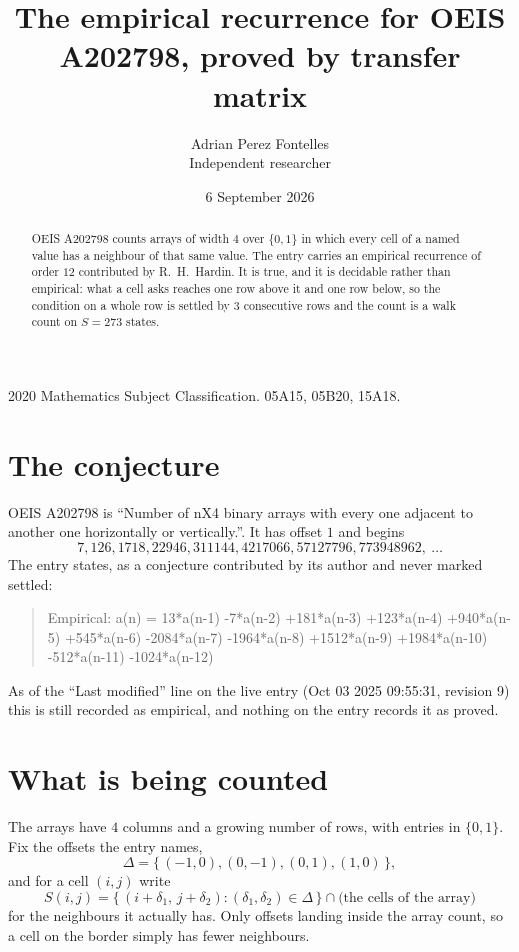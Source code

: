 \documentclass[11pt,a4paper]{article}
\title{The empirical recurrence for OEIS A202798, proved by transfer matrix}
\author{Adrian Perez Fontelles\\ \small Independent researcher}
\date{6 September 2026}
\theoremstyle{plain}
\theoremstyle{definition}
\begin{document}
\maketitle

\begin{abstract}
OEIS A202798 counts arrays of width $4$ over $\{0,1\}$ in which every cell of a named value has a neighbour of that same value. The entry carries an
empirical recurrence of order $12$ contributed by R.~H.~Hardin. It is true, and it is
decidable rather than empirical: what a cell asks reaches one row above it and one row below, so the
condition on a whole row is settled by $3$ consecutive rows and the count is a walk
count on $S=273$ states.
\end{abstract}

\noindent\small 2020 Mathematics Subject Classification. 05A15, 05B20, 15A18.\normalsize

\section{The conjecture}

OEIS A202798 is ``Number of nX4 binary arrays with every one adjacent to another one horizontally or vertically.''. It has offset $1$ and begins
\[
7, 126, 1718, 22946, 311144, 4217066, 57127796, 773948962,\ \dots
\]
The entry states, as a conjecture contributed by its author and never marked settled:
\begin{quote}
Empirical: a(n) = 13*a(n-1) -7*a(n-2) +181*a(n-3) +123*a(n-4) +940*a(n-5) +545*a(n-6) -2084*a(n-7) -1964*a(n-8) +1512*a(n-9) +1984*a(n-10) -512*a(n-11) -1024*a(n-12)
\end{quote}
As of the ``Last modified'' line on the live entry (Oct 03 2025 09:55:31, revision 9) this is still
recorded as empirical, and nothing on the entry records it as proved.

\section{What is being counted}

The arrays have $4$ columns and a growing number of rows, with entries in $\{0,1\}$. Fix the
offsets the entry names,
\[
\Delta=\{\,(-1,0), (0,-1), (0,1), (1,0)\,\},
\]
and for a cell $(i,j)$ write
\[
S(i,j)=\{\,(i+\delta_1,\,j+\delta_2) : (\delta_1,\delta_2)\in\Delta\,\}\cap
\text{(the cells of the array)}
\]
for the neighbours it actually has. Only offsets landing inside the array count, so a cell on
the border simply has fewer neighbours.
\end{document}
